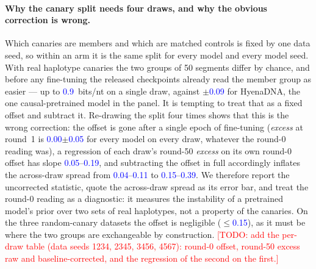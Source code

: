 \documentclass[10pt,letterpaper]{article}
\newcommand{\TODO}[1]{\textcolor{red}{[TODO: #1]}}
\newcommand{\NUM}[1]{\textcolor{blue}{#1}}
\newcommand{\bits}{bits/nt}
\newcommand{\excess}{\textit{excess}}
\begin{document}
\paragraph{Why the canary split needs four draws, and why the obvious correction is wrong.}
Which canaries are members and which are matched controls is fixed by one data seed, so within an arm
it is the same split for every model and every model seed. With real haplotype canaries the two
groups of 50 segments differ by chance, and before any fine-tuning the released checkpoints already
read the member group as easier --- up to \NUM{0.9}~\bits{} on a single draw, against
$\pm$\NUM{0.09} for HyenaDNA, the one causal-pretrained model in the panel. It is tempting to treat
that as a fixed offset and subtract it. Re-drawing the split four times shows that this is the wrong
correction: the offset is gone after a single epoch of fine-tuning (\excess{} at round~1 is
\NUM{0.00}$\pm$\NUM{0.05} for every model on every draw, whatever the round-0 reading was), a
regression of each draw's round-50 \excess{} on its own round-0 offset has slope
\NUM{0.05}--\NUM{0.19}, and subtracting the offset in full accordingly inflates the across-draw
spread from \NUM{0.04}--\NUM{0.11} to \NUM{0.15}--\NUM{0.39}. We therefore report the uncorrected
statistic, quote the across-draw spread as its error bar, and treat the round-0 reading as a
diagnostic: it measures the instability of a pretrained model's prior over two sets of real
haplotypes, not a property of the canaries. On the three random-canary datasets the offset is
negligible ($\le$\NUM{0.15}), as it must be where the two groups are exchangeable by construction.
\TODO{add the per-draw table (data seeds 1234, 2345, 3456, 4567): round-0 offset, round-50 excess
raw and baseline-corrected, and the regression of the second on the first.}
\end{document}
